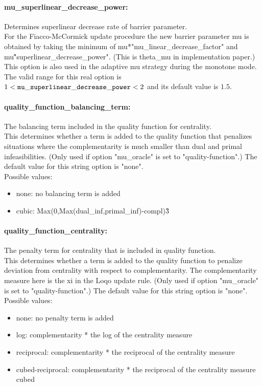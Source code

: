 \paragraph{mu\_superlinear\_decrease\_power:}\label{sec:mu_superlinear_decrease_power} Determines superlinear decrease rate of barrier parameter. $\;$ \\
 For the Fiacco-McCormick update procedure the new
barrier parameter mu is obtained by taking the
minimum of mu*"mu\_linear\_decrease\_factor" and
mu\^"superlinear\_decrease\_power".  (This is
theta\_mu in implementation paper.) This option
is also used in the adaptive mu strategy during
the monotone mode. The valid range for this real option is 
$1 <  {\tt mu\_superlinear\_decrease\_power } <  2$
and its default value is $1.5$.


\paragraph{quality\_function\_balancing\_term:}\label{sec:quality_function_balancing_term} The balancing term included in the quality function for centrality. $\;$ \\
 This determines whether a term is added to the
quality function that penalizes situations where
the complementarity is much smaller than dual and
primal infeasibilities. (Only used if option
"mu\_oracle" is set to "quality-function".)
The default value for this string option is "none".
\\ 
Possible values:
\begin{itemize}
   \item none: no balancing term is added
   \item cubic: Max(0,Max(dual\_inf,primal\_inf)-compl)\^3
\end{itemize}

\paragraph{quality\_function\_centrality:}\label{sec:quality_function_centrality} The penalty term for centrality that is included in quality function. $\;$ \\
 This determines whether a term is added to the
quality function to penalize deviation from
centrality with respect to complementarity.  The
complementarity measure here is the xi in the
Loqo update rule. (Only used if option
"mu\_oracle" is set to "quality-function".)
The default value for this string option is "none".
\\ 
Possible values:
\begin{itemize}
   \item none: no penalty term is added
   \item log: complementarity * the log of the centrality
measure
   \item reciprocal: complementarity * the reciprocal of the
centrality measure
   \item cubed-reciprocal: complementarity * the reciprocal of the
centrality measure cubed
\end{itemize}

